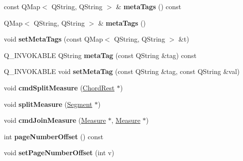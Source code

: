 \begin{DoxyCompactItemize}
\mbox{\label{class_ms_1_1_score_a77f6d8a8b8da64e43a7ceb2447d14bc4}} 
const Q\+Map$<$ Q\+String, Q\+String $>$ \& {\bfseries meta\+Tags} () const
\item 
\mbox{\label{class_ms_1_1_score_a31524c4f1af6c4859fdbee457e8ee98e}} 
Q\+Map$<$ Q\+String, Q\+String $>$ \& {\bfseries meta\+Tags} ()
\item 
\mbox{\label{class_ms_1_1_score_aa48241b9d4f93aaab0347f693477fdec}} 
void {\bfseries set\+Meta\+Tags} (const Q\+Map$<$ Q\+String, Q\+String $>$ \&t)
\item 
\mbox{\label{class_ms_1_1_score_a33c34750195b4427512931b735ce6cba}} 
Q\+\_\+\+I\+N\+V\+O\+K\+A\+B\+LE Q\+String {\bfseries meta\+Tag} (const Q\+String \&tag) const
\item 
\mbox{\label{class_ms_1_1_score_a0ecec63806ef4b6a348d99f22e467dec}} 
Q\+\_\+\+I\+N\+V\+O\+K\+A\+B\+LE void {\bfseries set\+Meta\+Tag} (const Q\+String \&tag, const Q\+String \&val)
\item 
\mbox{\label{class_ms_1_1_score_ac4ec0a0b6466642c3ded222399790040}} 
void {\bfseries cmd\+Split\+Measure} (\hyperlink{class_ms_1_1_chord_rest}{Chord\+Rest} $\ast$)
\item 
\mbox{\label{class_ms_1_1_score_a224305fa1d51915d23afabf5c1b46cbc}} 
void {\bfseries split\+Measure} (\hyperlink{class_ms_1_1_segment}{Segment} $\ast$)
\item 
\mbox{\label{class_ms_1_1_score_aba6085db1523002d9aee019775846aec}} 
void {\bfseries cmd\+Join\+Measure} (\hyperlink{class_ms_1_1_measure}{Measure} $\ast$, \hyperlink{class_ms_1_1_measure}{Measure} $\ast$)
\item 
\mbox{\label{class_ms_1_1_score_a8226b0d61543b1fca19861ca748900ba}} 
int {\bfseries page\+Number\+Offset} () const
\item 
\mbox{\label{class_ms_1_1_score_a0932d7d5757a579bcf9cfc2f8892fcd8}} 
void {\bfseries set\+Page\+Number\+Offset} (int v)

\end{DoxyCompactItemize}
